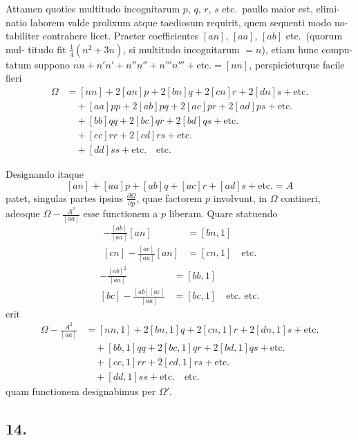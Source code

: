 \documentclass[12pt,a4paper]{article}
\begin{document}
Attamen quoties multitudo incognitarum $p$, $q$, $r$, $s$ etc.\ paullo maior est, elimi-
natio laborem valde prolixum atque taediosum requirit, quem sequenti modo no-
tabiliter contrahere licet. Praeter coefficientes $[an]$, $[aa]$, $[ab]$ etc.\ (quorum mul-
titudo fit $\frac{1}{4}(n^2 + 3n)$, si multitudo incognitarum $= n$), etiam hunc compu-
tatum suppono $nn + n'n' + n''n'' + n'''n''' + \text{etc.} = [nn]$, perspicieturque facile fieri
\begin{align*}
\Omega &= [nn] + 2[an]p + 2[bn]q + 2[cn]r + 2[dn]s + \text{etc.} \\
&\quad + [aa]pp + 2[ab]pq + 2[ac]pr + 2[ad]ps + \text{etc.} \\
&\quad + [bb]qq + 2[bc]qr + 2[bd]qs + \text{etc.} \\
&\quad + [cc]rr + 2[cd]rs + \text{etc.} \\
&\quad + [dd]ss + \text{etc.} \quad \text{etc.}
\end{align*}

Designando itaque
\[
[an] + [aa]p + [ab]q + [ac]r + [ad]s + \text{etc.} = A
\]
patet, singulas partes ipsius $\frac{\partial\Omega}{\partial p}$, quae factorem $p$ involvunt, in $\Omega$ contineri,
adeoque $\Omega - \frac{A^2}{[aa]}$ esse functionem a $p$ liberam. Quare statuendo
\begin{align*}
[bn] - \frac{[ab]}{[aa]}[an] &= [bn, 1] \\
[cn] - \frac{[ac]}{[aa]}[an] &= [cn, 1] \quad \text{etc.}
\end{align*}
\begin{align*}
[bb] - \frac{[ab]^2}{[aa]} &= [bb, 1] \\
[bc] - \frac{[ab][ac]}{[aa]} &= [bc, 1] \quad \text{etc. etc.}
\end{align*}
erit
\begin{align*}
\Omega - \frac{A^2}{[aa]} &= [nn, 1] + 2[bn, 1]q + 2[cn, 1]r + 2[dn, 1]s + \text{etc.} \\
&\quad + [bb, 1]qq + 2[bc, 1]qr + 2[bd, 1]qs + \text{etc.} \\
&\quad + [cc, 1]rr + 2[cd, 1]rs + \text{etc.} \\
&\quad + [dd, 1]ss + \text{etc.} \quad \text{etc.}
\end{align*}
quam functionem designabimus per $\Omega'$.

\subsection*{14.}
\end{document}
